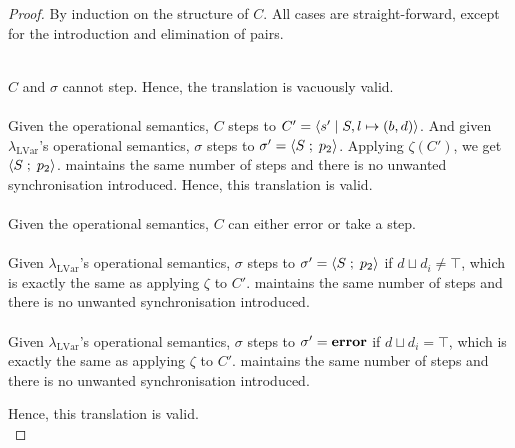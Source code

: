 \documentclass[main.tex]{subfiles}
\begin{document}
\begin{proof}
  By induction on the structure of $C$. All cases are straight-forward, except
  for the introduction and elimination of pairs.

 \\
 $C$ and $\sigma$ cannot step. Hence, the translation is vacuously valid.\\


 \\
  Given the operational semantics, $C$ steps to $C' = \langle {s'}\;\vert\;{S, l \mapsto (b,
    d)} \rangle$.
  And given $\lambda_{\text{LVar}}$'s operational semantics, $\sigma$ steps to
  $\sigma' = \langle {S} \; ; \;{p_2} \rangle$. Applying $\zeta (C')$, we get
  $\langle {S} \; ; \;{p_2} \rangle$. \typedlvar maintains the same number of steps and there is
  no unwanted synchronisation introduced. Hence, this translation is valid. \\


  \\
  Given the operational semantics, $C$ can either error or take a step.\\

     \\
    Given $\lambda_{\text{LVar}}$'s operational semantics, $\sigma$ steps to
    $\sigma' = \langle {S} \; ; \;{p_2} \rangle$ if $d \sqcup d_{i} \neq \top$, which is exactly
    the same as applying $\zeta$ to $C'$. \typedlvar maintains the same number
    of steps and there is no unwanted synchronisation introduced. \\


    \\
     Given $\lambda_{\text{LVar}}$'s operational semantics, $\sigma$ steps to
    $\sigma' = \mathbf{error}$ if $d \sqcup d_{i} = \top$, which is exactly
    the same as applying $\zeta$ to $C'$. \typedlvar maintains the same number
    of steps and there is no unwanted synchronisation introduced.

    Hence, this translation is valid. \\



\end{proof}
\end{document}

